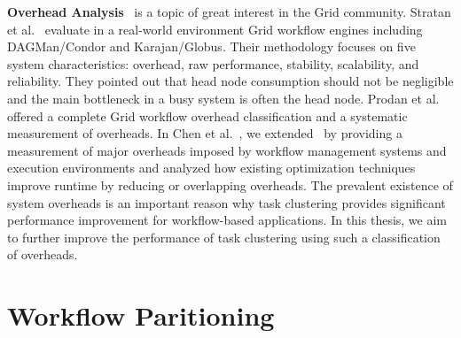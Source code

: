 \textbf{Overhead Analysis}~\cite{Ostberg2011, Prodan2008, Chen2011} is a topic of great interest in the Grid community. Stratan et al.~\cite{Stratan2008} evaluate in a real-world environment Grid workflow engines including DAGMan/Condor and Karajan/Globus. Their methodology focuses on five system characteristics: overhead, raw performance, stability, scalability, and reliability. They pointed out that head node consumption should not be negligible and the main bottleneck in a busy system is often the head node. Prodan et al.~\cite{Prodan2008} offered a complete Grid workflow overhead classification and a systematic measurement of overheads. In Chen et al.~\cite{Chen2011}, we extended~\cite{Prodan2008} by providing a measurement of major overheads imposed by workflow management systems and execution environments and analyzed how existing optimization techniques improve runtime by reducing or overlapping overheads. The prevalent existence of system overheads is an important reason why task clustering provides significant performance improvement for workflow-based applications. In this thesis, we aim to further improve the performance of task clustering using such a classification of overheads. 


\section{Workflow Paritioning}



